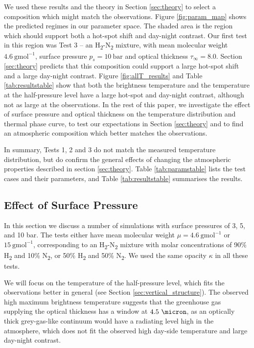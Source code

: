 We used these results and the theory in Section \ref{sec:theory} to select a composition which might match the observations. Figure \ref{fig:param_map} shows the predicted regimes in our parameter space. The shaded area is the region which should support both a hot-spot shift and day-night contrast. Our first test in this region was Test 3 -- an H\textsubscript{2}-N\textsubscript{2} mixture, with mean molecular weight $4.6\ \mathrm{gmol}^{-1}$, surface pressure $p_{s} = 10\ \mathrm{bar}$ and optical thickness $\tau_{\infty}= 8.0$. Section \ref{sec:theory} predicts that this composition could support a large hot-spot shift and a large day-night contrast. Figure \ref{fig:allT_results} and Table \ref{tab:resultstable} show that both the brightness temperature and the temperature at the half-pressure level have a large hot-spot and day-night contrast, although not as large at the observations. In the rest of this paper, we investigate the effect of surface pressure and optical thickness on the temperature distribution and thermal phase curve, to test our expectations in Section \ref{sec:theory} and to find an atmospheric composition which better matches the observations.

In summary, Tests 1, 2 and 3 do not match the measured temperature distribution, but do confirm the general effects of changing the atmospheric properties described in section \ref{sec:theory}. Table \ref{tab:paramstable} lists the test cases and their parameters, and Table \ref{tab:resultstable} summarises the results.


\subsection{Effect of Surface Pressure}\label{sec:ps_effect}

In this section we discuss a number of simulations with surface pressures of 3, 5, and 10 bar. The tests either have mean molecular weight $\mu = 4.6\ \mathrm{gmol}^{-1}$ or $15\ \mathrm{gmol}^{-1}$, corresponding to an H\textsubscript{2}-N\textsubscript{2} mixture with molar concentrations of 90\%  H\textsubscript{2} and 10\%   N\textsubscript{2}, or 50\%  H\textsubscript{2} and 50\%   N\textsubscript{2}. We used the same opacity $\kappa$ in all these tests.

We will focus on the temperature of the half-pressure level, which fits the observations better in general (see Section \ref{sec:vertical_structure}). The observed high maximum brightness temperature suggests that the greenhouse gas supplying the optical thickness has a window at $4.5\ \micron$, as an optically thick grey-gas-like continuum would have a radiating level high in the atmosphere, which does not fit the observed high day-side temperature and large day-night contrast.

